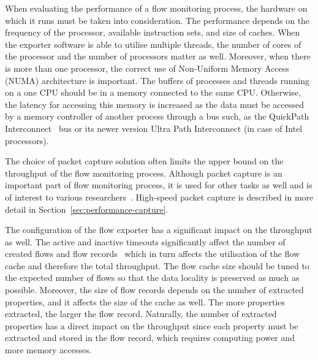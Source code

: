 When evaluating the performance of a flow monitoring process, the hardware on which it runs must be taken into consideration. The performance depends on the frequency of the processor, available instruction sets, and size of caches. When the exporter software is able to utilise multiple threads, the number of cores of the processor and the number of processors matter as well. Moreover, when there is more than one processor, the correct use of Non-Uniform Memory Access (NUMA) architecture is important. The buffers of processes and threads running on a one CPU should be in a memory connected to the same CPU. Otherwise, the latency for accessing this memory is increased as the data must be accessed by a memory controller of another process through a bus such, as the QuickPath Interconnect~\cite{IntelCorporation-2009-Introduction} bus or its newer version Ultra Path Interconnect (in case of Intel processors).

The choice of packet capture solution often limits the upper bound on the throughput of the flow monitoring process. Although packet capture is an important part of flow monitoring process, it is used for other tasks as well and is of interest to various researchers~\cite{Garcia-Dorado-2013-High, Nassopulos-2014-Flow}. High-speed packet capture is described in more detail in Section~\ref{sec:performance-capture}.

The configuration of the flow exporter has a significant impact on the throughput as well. The active and inactive timeouts significantly affect the number of created flows and flow records~\cite{Hofstede-2014-Flow} which in turn affects the utilisation of the flow cache and therefore the total throughput. The flow cache size should be tuned to the expected number of flows so that the data locality is preserved as much as possible. Moreover, the size of flow records depends on the number of extracted properties, and it affects the size of the cache as well. The more properties extracted, the larger the flow record. Naturally, the number of extracted properties has a direct impact on the throughput since each property must be extracted and stored in the flow record, which requires computing power and more memory accesses.

